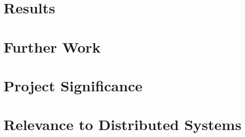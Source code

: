\documentclass[conference]{IEEEtran}
\begin{document}
\section{Results}


\section{Further Work}\label{sec:furtherwork}


\section{Project Significance}


\section{Relevance to Distributed Systems}


%



\end{document}
